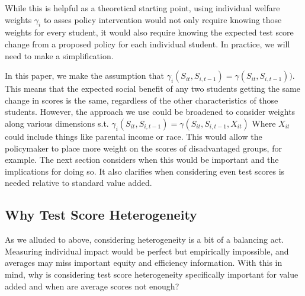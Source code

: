 \documentclass{article}
\theoremstyle{definition}
\theoremstyle{definition}
\theoremstyle{definition}
\theoremstyle{definition}
\begin{document}
    While this is helpful as a theoretical starting point, using individual welfare weights  $\gamma_i$ to asses policy intervention would not only require knowing those weights for every student, it would also require knowing the expected test score change from a proposed policy for each individual student. In practice, we will need to make a simplification.
    
    In this paper, we make the assumption that $\gamma_i(S_{it}, S_{i,t-1}) = \gamma(S_{it}, S_{i,t-1}))$. This means that the expected social benefit of any two students getting the same change in scores is the same, regardless of the other characteristics of those students. However, the approach we use could be broadened to consider weights along various dimensions s.t. $\gamma_i(S_{it}, S_{i,t-1}) = \gamma(S_{it}, S_{i,t-1}, X_{it})$ Where $X_{it}$ could include things like parental income or race. This would allow the policymaker to place more weight on the scores of disadvantaged groups, for example. The next section considers when this would be important and the implications for doing so. It also clarifies when considering even test scores is needed relative to standard value added. 
    

    
    \subsection{Why Test Score Heterogeneity}
    
    
    As we alluded to above, considering heterogeneity is a bit of a balancing act. Measuring individual impact would be perfect but empirically impossible, and averages may miss important equity and efficiency information. With this in mind, why is considering test score heterogeneity specifically important for value added and when are average scores not enough? 
    
\end{document}
